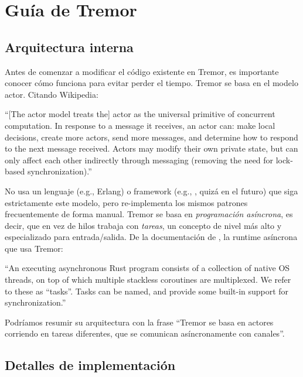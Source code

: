 \chapter{Guía de Tremor}\label{annex:tremor}

\section{Arquitectura interna}

Antes de comenzar a modificar el código existente en Tremor, es importante
conocer cómo funciona para evitar perder el tiempo. Tremor se basa en el modelo
actor. Citando Wikipedia:

``[The actor model treats the] actor as the universal primitive of concurrent
computation. In response to a message it receives, an actor can: make local
decisions, create more actors, send more messages, and determine how to respond
to the next message received. Actors may modify their own private state, but can
only affect each other indirectly through messaging (removing the need for
lock-based synchronization).''

No usa un lenguaje (e.g., Erlang) o framework (e.g., , quizá
en el futuro) que siga estrictamente este modelo, pero re-implementa los mismos
patrones frecuentemente de forma manual. Tremor se basa en \emph{programación
asíncrona}, es decir, que en vez de hilos trabaja con \emph{tareas}, un concepto
de nivel más alto y especializado para entrada/salida. De la documentación de
, la runtime asíncrona que usa Tremor:

``An executing asynchronous Rust program consists of a collection of native OS
threads, on top of which multiple stackless coroutines are multiplexed. We refer
to these as “tasks”. Tasks can be named, and provide some built-in support for
synchronization.''

Podríamos resumir su arquitectura con la frase ``Tremor se basa en actores
corriendo en tareas diferentes, que se comunican asíncronamente con canales''.

\section{Detalles de implementación}

